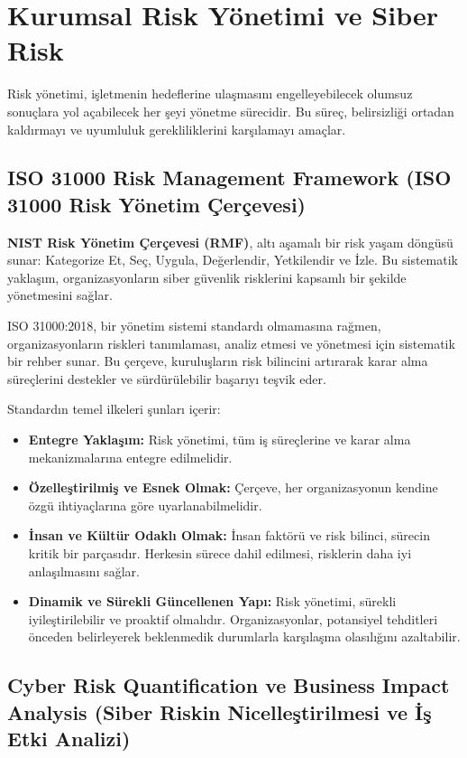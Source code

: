\section{Kurumsal Risk Yönetimi ve Siber Risk}

Risk yönetimi, işletmenin hedeflerine ulaşmasını engelleyebilecek olumsuz sonuçlara yol açabilecek her şeyi yönetme sürecidir. Bu süreç, belirsizliği ortadan kaldırmayı ve uyumluluk gerekliliklerini karşılamayı amaçlar.

\subsection{ISO 31000 Risk Management Framework (ISO 31000 Risk Yönetim Çerçevesi)}

\textbf{NIST Risk Yönetim Çerçevesi (RMF)}, altı aşamalı bir risk yaşam döngüsü sunar: Kategorize Et, Seç, Uygula, Değerlendir, Yetkilendir ve İzle. Bu sistematik yaklaşım, organizasyonların siber güvenlik risklerini kapsamlı bir şekilde yönetmesini sağlar.

ISO 31000:2018, bir yönetim sistemi standardı olmamasına rağmen, organizasyonların riskleri tanımlaması, analiz etmesi ve yönetmesi için sistematik bir rehber sunar. Bu çerçeve, kuruluşların risk bilincini artırarak karar alma süreçlerini destekler ve sürdürülebilir başarıyı teşvik eder.

Standardın temel ilkeleri şunları içerir:
\begin{itemize}
    \item \textbf{Entegre Yaklaşım:} Risk yönetimi, tüm iş süreçlerine ve karar alma mekanizmalarına entegre edilmelidir.
    \item \textbf{Özelleştirilmiş ve Esnek Olmak:} Çerçeve, her organizasyonun kendine özgü ihtiyaçlarına göre uyarlanabilmelidir.
    \item \textbf{İnsan ve Kültür Odaklı Olmak:} İnsan faktörü ve risk bilinci, sürecin kritik bir parçasıdır. Herkesin sürece dahil edilmesi, risklerin daha iyi anlaşılmasını sağlar.
    \item \textbf{Dinamik ve Sürekli Güncellenen Yapı:} Risk yönetimi, sürekli iyileştirilebilir ve proaktif olmalıdır. Organizasyonlar, potansiyel tehditleri önceden belirleyerek beklenmedik durumlarla karşılaşma olasılığını azaltabilir.
\end{itemize}

\subsection{Cyber Risk Quantification ve Business Impact Analysis (Siber Riskin Nicelleştirilmesi ve İş Etki Analizi)}

